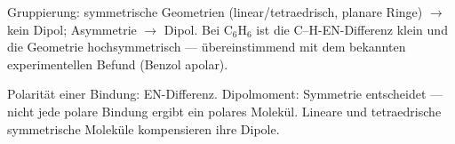 \begin{kontrolle}
Gruppierung: symmetrische Geometrien (linear/tetraedrisch, planare
Ringe) $\to$ kein Dipol; Asymmetrie $\to$ Dipol. Bei $\mathrm{C_6H_6}$ ist die
C--H-EN-Differenz klein und die Geometrie hochsymmetrisch --- übereinstimmend
mit dem bekannten experimentellen Befund (Benzol apolar).
\end{kontrolle}

\begin{merksatz}
Polarität einer Bindung: EN-Differenz. Dipolmoment: Symmetrie entscheidet ---
nicht jede polare Bindung ergibt ein polares Molekül. Lineare und
tetraedrische symmetrische Moleküle kompensieren ihre Dipole.
\end{merksatz}
